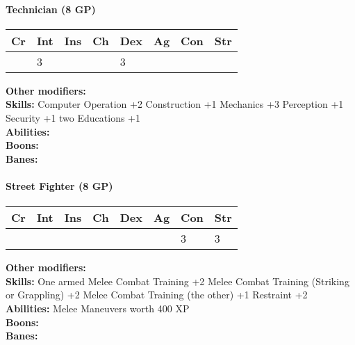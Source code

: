 \documentclass[12pt,a4paper,openany]{book}
\begin{document}
	\paragraph*{Technician (8 GP)}
	\textit{}\par
	\begin{tabular}{|l|l|l|l|l|l|l|l|}
		\hline
		Cr & Int & Ins & Ch & Dex & Ag & Con & Str \\ \hline
		& 3 &  &  & 3 &  &  &  \\ \hline
	\end{tabular}\par
	\noindent\textbf{Other modifiers:} \\
	\textbf{Skills:} Computer Operation +2
	Construction +1
	Mechanics +3
	Perception +1
	Security +1
	two Educations +1\\
	\textbf{Abilities:} \\
	\textbf{Boons:} \\
	\textbf{Banes:} \\
	
	\hrulefill
	\paragraph*{Street Fighter (8 GP)}
	\textit{}\par
	\begin{tabular}{|l|l|l|l|l|l|l|l|}
		\hline
		Cr & Int & Ins & Ch & Dex & Ag & Con & Str \\ \hline
		&  &  &  &  &  & 3 & 3 \\ \hline
	\end{tabular}\par
	\noindent\textbf{Other modifiers:} \\
	\textbf{Skills:} One armed Melee Combat Training +2
	Melee Combat Training (Striking or Grappling) +2
	Melee Combat Training (the other) +1
	Restraint +2\\
	\textbf{Abilities:} Melee Maneuvers worth 400 XP\\
	\textbf{Boons:} \\
	\textbf{Banes:} \\
	
	
\end{document}
